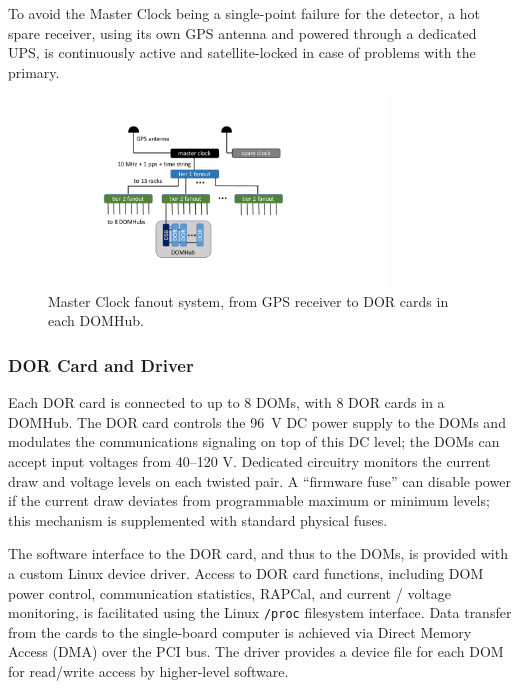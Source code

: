 To avoid the Master Clock being a single-point failure for the detector, a
hot spare receiver, using its own GPS antenna and powered through a
dedicated UPS, is continuously active and satellite-locked in case of problems with
the primary.

\begin{figure}[!ht]
 \centering
 \includegraphics[width=0.8\textwidth]{graphics/online/data_readout/clock_fanout.pdf}
 \caption{Master Clock fanout system, from GPS receiver to DOR cards in
   each DOMHub.}
 \label{fig:clock_fanout}
\end{figure}


\subsubsection{DOR Card and Driver}

Each DOR card is connected to up to 8 DOMs, with 8 DOR cards in a
DOMHub. The DOR card controls the 96~V DC power supply to the DOMs and
modulates the communications signaling on top of this DC level; the DOMs
can accept input voltages from 40--120 V.
Dedicated circuitry monitors the current draw and voltage levels on each
twisted pair. A ``firmware fuse'' can disable power if the current draw
deviates from programmable maximum or minimum levels; this mechanism is
supplemented with standard physical fuses.  

The software interface to the DOR card, and thus to the DOMs, is provided
with a custom Linux device driver.  Access to DOR card functions, including
DOM power control, communication statistics, RAPCal, and current / voltage
monitoring, is facilitated using the Linux \texttt{/proc} filesystem
interface.  Data transfer from the cards to the single-board computer is
achieved via Direct Memory Access (DMA) over the PCI bus.  The driver
provides a device file for each DOM for read/write access by higher-level software.

